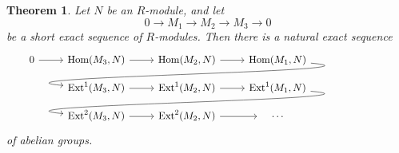 \documentclass[11pt]{amsbook}
\newcommand{\longto}{\longrightarrow}
\DeclareMathOperator\Hom{Hom}
\DeclareMathOperator\Ext{Ext}
\theoremstyle{plain}
\newtheorem{theorem}{Theorem}
\theoremstyle{definition}
\begin{document}

\begin{theorem}\label{thm:long-exact-sequence-of-Ext}
Let $N$ be an $R$-module, and let
\[
	0 \longto M_1 \longto M_2 \longto M_3 \longto 0
\]
be a short exact sequence of $R$-modules. Then there is a natural exact sequence
\[
\mkern-72mu\begin{tikzcd}[row sep=small]
	0 \arrow{r}
		& \Hom(M_3,N) \arrow{r}
		& \Hom(M_2,N) \arrow{r} 
		& \Hom(M_1,N)  \arrow[out=-5, in=175]{dll} \\
	& \Ext^1(M_3,N) \arrow{r}
		& \Ext^1(M_2,N) \arrow{r} 
		& \Ext^1(M_1,N)  \arrow[out=-5, in=175]{dll} \\
	& \Ext^2(M_3,N) \arrow{r}
		& \Ext^2(M_2,N) \arrow{r} 
		& \quad\cdots\quad
\end{tikzcd} 
\]
of abelian groups.
\end{theorem}

\end{document}
